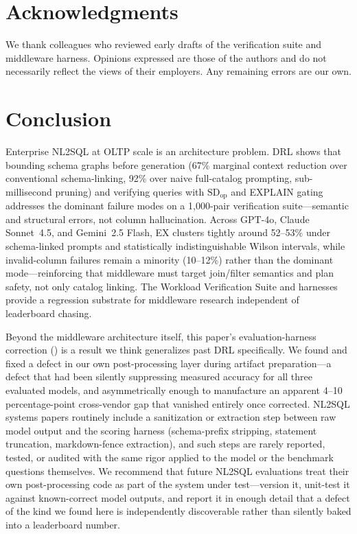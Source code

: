 \documentclass[twocolumn]{svjour3}
\begin{document}
\section*{Acknowledgments}
We thank colleagues who reviewed early drafts of the verification suite and middleware harness.
Opinions expressed are those of the authors and do not necessarily reflect the views of their employers.
Any remaining errors are our own.

\section{Conclusion}
\label{sec:conclusion}

Enterprise NL2SQL at OLTP scale is an architecture problem.
DRL shows that bounding schema graphs before generation (67\% marginal context reduction over conventional schema-linking, 92\% over naive full-catalog prompting, sub-millisecond pruning) and verifying queries with $\text{SD}_{\text{op}}$ and EXPLAIN gating addresses the dominant failure modes on a 1{,}000-pair verification suite---semantic and structural errors, not column hallucination.
Across GPT-4o, Claude Sonnet~4.5, and Gemini~2.5 Flash, EX clusters tightly around 52--53\% under schema-linked prompts and statistically indistinguishable Wilson intervals, while invalid-column failures remain a minority (10--12\%) rather than the dominant mode---reinforcing that middleware must target join/filter semantics and plan safety, not only catalog linking.
The Workload Verification Suite and harnesses provide a regression substrate for middleware research independent of leaderboard chasing.

Beyond the middleware architecture itself, this paper's evaluation-harness correction () is a result we think generalizes past DRL specifically.
We found and fixed a defect in our own post-processing layer during artifact preparation---a defect that had been silently suppressing measured accuracy for all three evaluated models, and asymmetrically enough to manufacture an apparent 4--10 percentage-point cross-vendor gap that vanished entirely once corrected.
NL2SQL systems papers routinely include a sanitization or extraction step between raw model output and the scoring harness (schema-prefix stripping, statement truncation, markdown-fence extraction), and such steps are rarely reported, tested, or audited with the same rigor applied to the model or the benchmark questions themselves.
We recommend that future NL2SQL evaluations treat their own post-processing code as part of the system under test---version it, unit-test it against known-correct model outputs, and report it in enough detail that a defect of the kind we found here is independently discoverable rather than silently baked into a leaderboard number.
\end{document}

